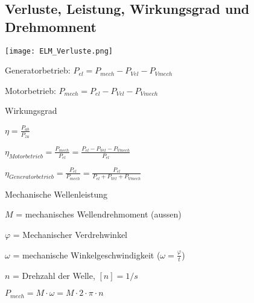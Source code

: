\documentclass[german]{latex4ei/latex4ei_sheet}
\begin{document}
	\begin{sectionbox}
		\subsection{Verluste, Leistung, Wirkungsgrad und Drehmomnent}
			\texttt{[image: ELM\_Verluste.png]}
			\begin{symbolbox}
				\item Generatorbetrieb: $P_{el} = P_{mech} -P_{Vel}-P_{Vmech}$
				\item Motorbetrieb: $P_{mech} = P_{el} -P_{Vel} -P_{Vmech}$
			\end{symbolbox}
			\begin{bluebox}{Wirkungsgrad}
				\item $\eta = \frac{P_{ab}}{P_{zu}}$
				\item $\eta_{Motorbetrieb} = \frac{P_{mech}}{P_{el}} = \frac{P_{el} -P_{Vel} -P_{Vmech}}{P_{el}}$
				\item$\eta_{Generatorbetrieb} = \frac{P_{el}}{P_{mech}} = \frac{P_{el}}{P_{el}+P_{Vel}+P_{Vmech}}$
			\end{bluebox}
			
			\begin{symbolbox}{Mechanische Wellenleistung}
				\item $M$ = mechanisches Wellendrehmoment (aussen)
				\item $\varphi$ = Mechanischer Verdrehwinkel
				\item $\omega$ = mechanische Winkelgeschwindigkeit ($\omega = \frac{\varphi}{t}$)
				\item $n$ = Drehzahl der Welle, $[n] = 1/s$
				\item $P_{mech} = M \cdot \omega = M \cdot 2\cdot \pi\cdot n$
			\end{symbolbox}


\end{sectionbox}
\end{document}
